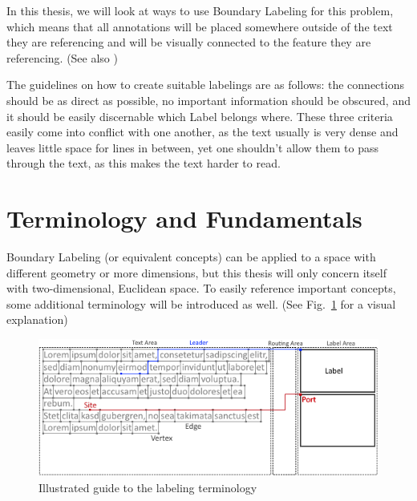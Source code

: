 \documentclass[11pt,a4paper]{vutinfth}
\begin{document}
In this thesis, we will look at ways to use Boundary Labeling for this problem, which means that all annotations will be placed somewhere outside of the text they are referencing and will be visually connected to the feature they are referencing. (See also \cite{Bekos2005}) 

The guidelines on how to create suitable labelings are as follows: the connections should be as direct as possible, no important information should be obscured, and it should be easily discernable which Label belongs where. These three criteria easily come into conflict with one another, as the text usually is very dense and leaves little space for lines in between, yet one shouldn't allow them to pass through the text, as this makes the text harder to read. 

\section{Terminology and Fundamentals} 
Boundary Labeling (or equivalent concepts) can be applied to a space with different geometry or more dimensions, but this thesis will only concern itself with two-dimensional, Euclidean space.
To easily reference important concepts, some additional terminology will be introduced as well. (See Fig.~\ref*{fig:term} for a visual explanation)


\begin{figure}
 \captionsetup{justification=centering, margin=0.75cm}
 \centering
  \includegraphics[scale=0.95]{GraphTerminologyExtended.png}
  \caption{Illustrated guide to the labeling terminology}
 \label{fig:term}
\end{figure}
\end{document}
